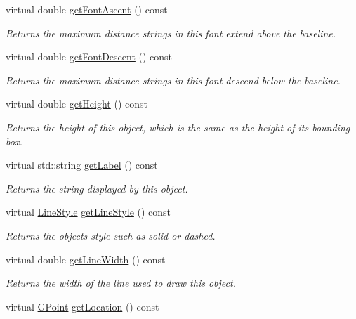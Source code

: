 \begin{DoxyCompactItemize}
virtual double \mbox{\hyperlink{classsgl_1_1GText_ab7583914978530e097034293e9d316ad}{get\+Font\+Ascent}} () const
\begin{DoxyCompactList}\small\item\em Returns the maximum distance strings in this font extend above the baseline. \end{DoxyCompactList}\item 
virtual double \mbox{\hyperlink{classsgl_1_1GText_a2908216e19046c9747c0fc3b0d088621}{get\+Font\+Descent}} () const
\begin{DoxyCompactList}\small\item\em Returns the maximum distance strings in this font descend below the baseline. \end{DoxyCompactList}\item 
virtual double \mbox{\hyperlink{classsgl_1_1GObject_a1e7e353362434072875264cf95629f99}{get\+Height}} () const
\begin{DoxyCompactList}\small\item\em Returns the height of this object, which is the same as the height of its bounding box. \end{DoxyCompactList}\item 
virtual std\+::string \mbox{\hyperlink{classsgl_1_1GText_aa73aa351564b091c0658f2368c6d5c5f}{get\+Label}} () const
\begin{DoxyCompactList}\small\item\em Returns the string displayed by this object. \end{DoxyCompactList}\item 
virtual \mbox{\hyperlink{classsgl_1_1GObject_a86e0f5648542856159bb40775c854aa7}{Line\+Style}} \mbox{\hyperlink{classsgl_1_1GObject_aaf1f5ea8281e5e3486662878d26f0a13}{get\+Line\+Style}} () const
\begin{DoxyCompactList}\small\item\em Returns the object\textquotesingle{}s style such as solid or dashed. \end{DoxyCompactList}\item 
virtual double \mbox{\hyperlink{classsgl_1_1GObject_a85ff266dc3eb63d9f2d8e5a4487fd3c0}{get\+Line\+Width}} () const
\begin{DoxyCompactList}\small\item\em Returns the width of the line used to draw this object. \end{DoxyCompactList}\item 
virtual \mbox{\hyperlink{structsgl_1_1GPoint}{G\+Point}} \mbox{\hyperlink{classsgl_1_1GObject_a4f83802015511edeb63b892830812c11}{get\+Location}} () const

\end{DoxyCompactItemize}
